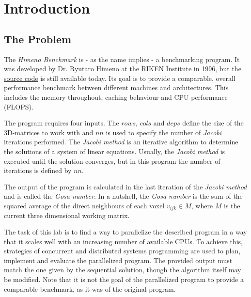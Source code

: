 \newcommand{\reporttitle}{CDS Lab Report - Himeno benchmark}
\newcommand{\hb}{\textit{Himeno Benchmark}}
\newcommand{\jm}{\textit{Jacobi method}}



\baselineskip16pt
\maketitle
\thispagestyle{empty}


\clearpage
\setcounter{page}{1}

\section{Introduction}
\label{sec:introduction}

\subsection{The Problem}
\label{ssec:problem}

The \hb{} is - as the name implies - a benchmarking program. It was developed by Dr. Ryutaro Himeno at the RIKEN Institute in 1996, but the \href{https://i.riken.jp/en/supercom/documents/himenobmt/}{source code} is still available today. Its goal is to provide a comparable, overall performance benchmark between different machines and architectures. This includes the memory throughout, caching behaviour and CPU performance (FLOPS).

The program requires four inputs. The $rows$, $cols$ and $deps$ define the size of the 3D-matrices to work with and $nn$ is used to specify the number of \textit{Jacobi} iterations performed. The \jm{} is an iterative algorithm to determine the solutions of a system of linear equations. Usually, the \jm{} is executed until the solution converges, but in this program the number of iterations is defined by $nn$.

The output of the program is calculated in the last iteration of the \jm{} and is called the \textit{Gosa number}. In a nutshell, the \textit{Gosa number} is the sum of the squared average of the direct neighbours of each voxel $v_{ijk} \in M$, where $M$ is the current three dimensional working matrix.

The task of this lab is to find a way to parallelize the described program in a way that it scales well with an increasing number of available CPUs. To achieve this, strategies of concurrent and distributed systems programming are used to plan, implement and evaluate the parallelized program. The provided output must match the one given by the sequential solution, though the algorithm itself may be modified. Note that it is not the goal of the parallelized program to provide a comparable benchmark, as it was of the original program.



